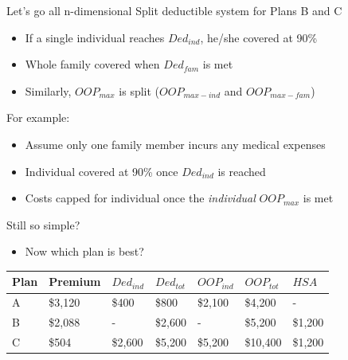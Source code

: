 \documentclass[sans,aspectratio=169,presentation,bigger,fleqn]{beamer}
\begin{document}
\begin{frame}[label=sec-15]{Let's go all n-dimensional}
Split deductible system for Plans B and C
\begin{itemize}
\item If a single individual reaches \(Ded_{ind}\), he/she covered at 90\%
\item Whole family covered when \(Ded_{fam}\) is met
\item Similarly, \(OOP_{max}\) is split (\(OOP_{max-ind}\) and \(OOP_{max-fam}\))
\end{itemize}

\vspace{0.25cm}

For example:
\begin{itemize}
\item Assume only one family member incurs any medical expenses
\item Individual covered at 90\% once \(Ded_{ind}\) is reached
\item Costs capped for individual once the \emph{individual} \(OOP_{max}\) is met
\end{itemize}
\end{frame}
\begin{frame}[label=sec-16]{Still so simple?}
\begin{itemize}
\item Now which plan is best?
\end{itemize}

\scriptsize
\begin{center}
\begin{tabular}{lllllll}
\toprule
Plan & Premium & \(Ded_{ind}\) & \(Ded_{tot}\) & \(OOP_{ind}\) & \(OOP_{tot}\) & \(HSA\)\\
\midrule
A & \$3,120 & \$400 & \$800 & \$2,100 & \$4,200 & -\\
B & \$2,088 & - & \$2,600 & - & \$5,200 & \$1,200\\
C & \$504 & \$2,600 & \$5,200 & \$5,200 & \$10,400 & \$1,200\\
\bottomrule
\end{tabular}
\end{center}
\normalsize
\end{frame}
\end{document}
